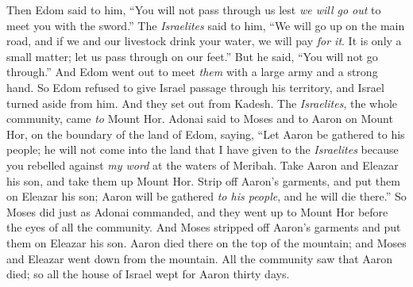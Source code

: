 \begin{biblechapter}
\verse Then Edom said to him, “You will not pass through us lest \textit{we will go out} to meet you with the sword.”
\verse The \textit{Israelites} said to him, “We will go up on the main road, and if we and our livestock drink your water, we will pay \textit{for it}. It is only a small matter; let us pass through on our feet.”
\verse But he said, “You will not go through.” And Edom went out to meet \textit{them} with a large army and a strong hand.
\verse So Edom refused to give Israel passage through his territory, and Israel turned aside from him.
 And they set out from Kadesh. The \textit{Israelites}, the whole community, came \textit{to} Mount Hor.
\verse Adonai said to Moses and to Aaron on Mount Hor, on the boundary of the land of Edom, saying,
\verse “Let Aaron be gathered to his people; he will not come into the land that I have given to the \textit{Israelites} because you rebelled against \textit{my word} at the waters of Meribah.
\verse Take Aaron and Eleazar his son, and take them up Mount Hor.
\verse Strip off Aaron’s garments, and put them on Eleazar his son; Aaron will be gathered \textit{to his people}, and he will die there.”
\verse So Moses did just as Adonai commanded, and they went up to Mount Hor before the eyes of all the community.
\verse And Moses stripped off Aaron’s garments and put them on Eleazar his son. Aaron died there on the top of the mountain; and Moses and Eleazar went down from the mountain.
\verse All the community saw that Aaron died; so all the house of Israel wept for Aaron thirty days.
\end{biblechapter}

